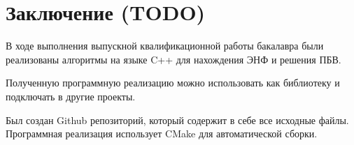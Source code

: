 \newpage

\section{Заключение (TODO)}

В ходе выполнения выпускной квалификационной работы бакалавра были реализованы алгоритмы на языке C++ для нахождения ЭНФ и решения ПБВ.

Полученную программную реализацию можно использовать как библиотеку и подключать в другие проекты.

Был создан Github репозиторий, который содержит в себе все исходные файлы. Программная реализация использует CMake для автоматической сборки.

\clearpage